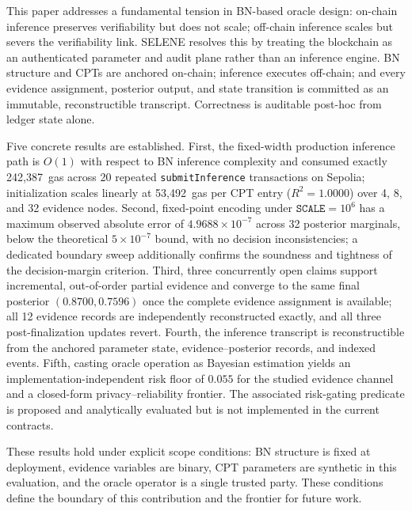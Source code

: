 \documentclass[journal]{IEEEtran}
\theoremstyle{definition}
\theoremstyle{remark}
\begin{document}
This paper addresses a fundamental tension in
BN-based oracle design: on-chain inference preserves
verifiability but does not scale; off-chain inference
scales but severs the verifiability link.
SELENE resolves this by treating the blockchain as an
authenticated parameter and audit plane rather than
an inference engine. BN structure and CPTs are
anchored on-chain; inference executes off-chain; and
every evidence assignment, posterior output, and state
transition is committed as an immutable,
reconstructible transcript. Correctness is auditable
post-hoc from ledger state alone.

Five concrete results are established. First, the
fixed-width production inference path is $O(1)$ with
respect to BN inference complexity and consumed exactly
242{,}387~gas across 20 repeated
\texttt{submitInference} transactions on Sepolia;
initialization scales linearly at 53{,}492~gas per CPT
entry ($R^2=1.0000$) over 4, 8, and 32 evidence nodes.
Second, fixed-point encoding under
$\texttt{SCALE}=10^6$ has a maximum observed absolute
error of $4.9688\times10^{-7}$ across 32 posterior
marginals, below the theoretical
$5\times10^{-7}$ bound, with no decision
inconsistencies; a dedicated boundary sweep additionally
confirms the soundness and tightness of the decision-margin
criterion. Third, three concurrently open claims support
incremental, out-of-order partial evidence and converge to
the same final posterior
$(0.8700,0.7596)$ once the complete evidence assignment is
available; all 12 evidence records are independently
reconstructed exactly, and all three post-finalization
updates revert. Fourth, the inference transcript is
reconstructible from the anchored parameter state,
evidence--posterior records, and indexed events. Fifth,
casting oracle operation as Bayesian estimation yields an
implementation-independent risk floor of $0.055$ for the
studied evidence channel and a closed-form
privacy--reliability frontier. The associated risk-gating
predicate is proposed and analytically evaluated but is
not implemented in the current contracts.

These results hold under explicit scope conditions:
BN structure is fixed at deployment, evidence
variables are binary, CPT parameters are synthetic
in this evaluation, and the oracle operator is a
single trusted party. These conditions define the
boundary of this contribution and the frontier for
future work.
\end{document}
